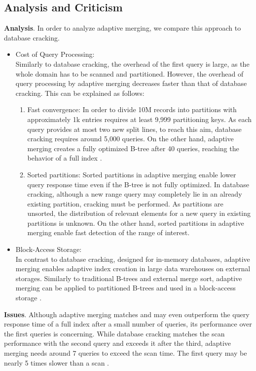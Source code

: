 \documentclass[10pt, conference, compsocconf]{IEEEtran}
\begin{document}
\subsection{Analysis and Criticism}
\label{subsec:merging_analysis}
\textbf{Analysis}. In order to analyze adaptive merging, we compare this approach to database cracking.\\
\begin{itemize}
\item{Cost of Query Processing:} \\Similarly to database cracking, the overhead of the first query is large, as the whole domain has to be scanned and partitioned. However, the overhead of query processing by adaptive merging decreases faster than that of database cracking. This can be explained as follows:\\
\begin{enumerate}
\item{Fast convergence}: In order to divide 10M records into partitions with approximately 1k entries requires at least 9,999 partitioning keys. As each query provides at most two new split lines, to reach this aim, database cracking requires around 5,000 queries. On the other hand, adaptive merging creates a fully optimized B-tree after 40 queries, reaching the behavior of a full index \cite{merging}.
\item{Sorted partitions}: Sorted partitions in adaptive merging enable lower query response time even if the B-tree is not fully optimized. In database cracking, although a new range query may completely lie in an already existing partition, cracking must be performed. As partitions are unsorted, the distribution of relevant elements for a new query in existing partitions is unknown. On the other hand, sorted partitions in adaptive merging enable fast detection of the range of interest.\\
\end{enumerate}
\item{Block-Access Storage:} \\ In contrast to database cracking, designed for in-memory databases, adaptive merging enables adaptive index creation in large data warehouses on external storages. Similarly to traditional B-trees and external merge sort, adaptive merging can be applied to partitioned B-trees and used in a block-access storage \cite{merging}. \\
\end{itemize}

\textbf{Issues}. Although adaptive merging matches and may even outperform the query response time of a full index after a small number of queries, its performance over the first queries is concerning. While database cracking matches the scan performance with the second query and exceeds it after the third, adaptive merging needs around 7 queries to exceed the scan time. The first query may be nearly 5 times slower than a scan \cite{hybrid}.
\end{document}
